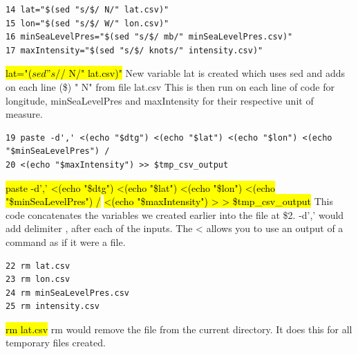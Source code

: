 \documentclass[]{article}
\begin{document}
\begin{tcolorbox}[colback=white, colframe=black, boxrule=0.5pt, arc=2mm, 
    title=Third part of the code, fonttitle=\bfseries, listing only, listing options={language=sh, basicstyle=\ttfamily}]
    \begin{verbatim}
14 lat="$(sed "s/$/ N/" lat.csv)"
15 lon="$(sed "s/$/ W/" lon.csv)"
16 minSeaLevelPres="$(sed "s/$/ mb/" minSeaLevelPres.csv)"
17 maxIntensity="$(sed "s/$/ knots/" intensity.csv)"
    \end{verbatim}
    \hl{lat="$(sed "s/$/ N/" lat.csv)"}\newline
    New variable lat is created which uses sed and adds on each line (\$) " N" from file lat.csv\newline
    This is then run on each line of code for longitude, minSeaLevelPres and maxIntensity for their\newline
    respective unit of measure.\newline
\end{tcolorbox}

\begin{tcolorbox}[colback=white, colframe=black, boxrule=0.5pt, arc=2mm, 
    title=Fourth part of the code, fonttitle=\bfseries, listing only, listing options={language=sh, basicstyle=\ttfamily}]
    \begin{verbatim}
19 paste -d',' <(echo "$dtg") <(echo "$lat") <(echo "$lon") <(echo "$minSeaLevelPres") /
20 <(echo "$maxIntensity") >> $tmp_csv_output
    \end{verbatim}
\hl{paste -d',' <(echo "\$dtg") <(echo "\$lat") <(echo "\$lon") <(echo "\$minSeaLevelPres") /}\newline
\hl{<(echo "\$maxIntensity") > > \$tmp\_csv\_output}\newline
This code concatenates the variables we created earlier into the file at \$2.\newline
-d',' would add delimiter , after each of the inputs. The < allows you to use an output\newline
of a command as if it were a file.
\end{tcolorbox}

\begin{tcolorbox}[colback=white, colframe=black, boxrule=0.5pt, arc=2mm, 
    title=Last part of the code, fonttitle=\bfseries, listing only, listing options={language=sh, basicstyle=\ttfamily}]
    \begin{verbatim}
22 rm lat.csv
23 rm lon.csv
24 rm minSeaLevelPres.csv
25 rm intensity.csv
    \end{verbatim}
\hl{rm lat.csv}\newline
rm would remove the file from the current directory. It does this for all temporary files created.
\end{tcolorbox}
\clearpage
\end{document}
